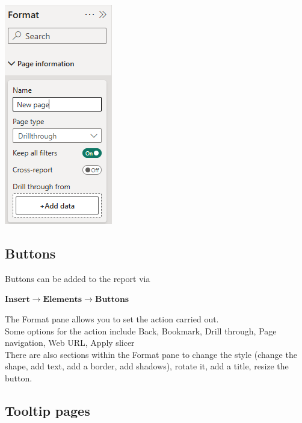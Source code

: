 \documentclass[10pt, openany, twocolumn]{book}
\begin{document}
\begin{center}
    \includegraphics[width=0.52\columnwidth]{images/drillthroughformat.png}
\end{center}

\subsection*{Buttons}

Buttons can be added to the report via

$\textbf{Insert} \rightarrow \textbf{Elements} \rightarrow \textbf{Buttons}$

The Format pane allows you to set the action carried out. \\
Some options for the action include Back, Bookmark, Drill through, Page navigation, Web URL, Apply slicer\\

There are also sections within the Format pane to change the style (change the shape, add text, add a border, add shadows), rotate it, add a title, resize the button.

\subsection*{Tooltip pages}
\end{document}
